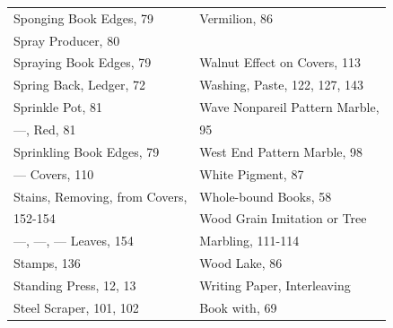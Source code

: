 \documentclass[twoside]{book}
\begin{document}
\begin{center}
\begin{tiny}
\begin{tabular}{l|l}
Sponging Book Edges, 79            & Vermilion, 86                      \\
Spray Producer, 80                 &                                    \\
Spraying Book Edges, 79            & Walnut Effect on Covers, 113       \\
Spring Back, Ledger, 72            & Washing, Paste, 122, 127, 143      \\
Sprinkle Pot, 81                   & Wave Nonpareil Pattern Marble,     \\
---, Red, 81                       &     95                             \\
Sprinkling Book Edges, 79          & West End Pattern Marble, 98        \\
--- Covers, 110                    & White Pigment, 87                  \\
Stains, Removing, from Covers,     & Whole-bound Books, 58              \\
    152-154                        & Wood Grain Imitation or Tree       \\
---, ---, --- Leaves, 154          &     Marbling, 111-114              \\
Stamps, 136                        & Wood Lake, 86                      \\
Standing Press, 12, 13             & Writing Paper, Interleaving        \\
Steel Scraper, 101, 102            &     Book with, 69                  \\

\end{tabular}

\end{tiny}

\end{center}

\pagebreak
\end{document}

